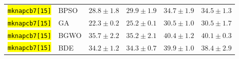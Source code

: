 \documentclass[mathematics,article,accept,moreauthors]{Definitions/mdpi}
\begin{document}
\begin{table}[H]
\begin{tabularx}{\textwidth}{XLCCCC}
    \midrule
    \texttt{\hl{mknapcb7[15]}} & BPSO  &  $\mathbf{28.8 \pm 1.8}$ &           $29.9 \pm 1.9$ &           $34.7 \pm 1.9$ &           $34.5 \pm 1.3$ \\
    \texttt{\hl{mknapcb7[15]}} & GA    &  $\mathbf{22.3 \pm 0.2}$ &           $25.2 \pm 0.1$ &           $30.5 \pm 1.0$ &           $30.5 \pm 1.7$ \\
    \texttt{\hl{mknapcb7[15]}} & BGWO  &           $35.7 \pm 2.2$ &  $\mathbf{35.2 \pm 2.1}$ &           $40.4 \pm 1.2$ &           $40.1 \pm 0.3$ \\
    \texttt{\hl{mknapcb7[15]}} & BDE   &  $\mathbf{34.2 \pm 1.2}$ &           $34.3 \pm 0.7$ &           $39.9 \pm 1.0$ &           $38.4 \pm 2.9$ \\


\bottomrule
\end{tabularx} %
\end{table}
\end{document}
